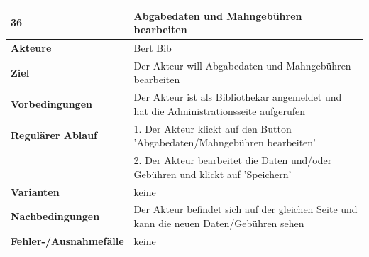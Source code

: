\documentclass[fontsize=12pt,paper=a4,twoside]{scrartcl}
\begin{document}
\begin{table}[htbp]
\label{36}
\begin{tabular}{|l|p{10cm}|}
\hline 
\textbf{36} & \textbf{Abgabedaten und Mahngebühren bearbeiten} \\ \hline
\textbf{Akteure} & Bert Bib\\ \hline
\textbf{Ziel} & Der Akteur will Abgabedaten und Mahngebühren bearbeiten \\ \hline
\textbf{Vorbedingungen} & Der Akteur ist als Bibliothekar angemeldet und hat die Administrationsseite aufgerufen \\ \hline
\textbf{Regulärer Ablauf} & 
1. Der Akteur klickt auf den Button 'Abgabedaten/Mahngebühren bearbeiten' \\
&2. Der Akteur bearbeitet die Daten und/oder Gebühren und klickt auf 'Speichern'\\
\hline
\textbf{Varianten} & 
keine \\ \hline
\textbf{Nachbedingungen} & Der Akteur befindet sich auf der gleichen Seite und kann die neuen Daten/Gebühren sehen\\ \hline
\textbf{Fehler-/Ausnahmefälle} & keine\\
\hline
\end{tabular}
\end{table}

\newpage
\end{document}
